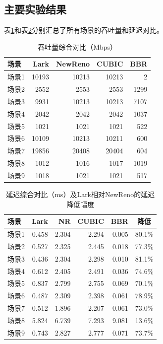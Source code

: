 \documentclass[10pt,twocolumn]{article}
\begin{document}
\subsection{主要实验结果}

表\ref{tab:throughput}和表\ref{tab:latency}分别汇总了所有场景的吞吐量和延迟对比。

\begin{table}[htbp]
\centering
\caption{吞吐量综合对比（Mbps）}
\label{tab:throughput}
\small
\begin{tabular}{lrrrr}
\toprule
\textbf{场景} & \textbf{Lark} & \textbf{NewReno} & \textbf{CUBIC} & \textbf{BBR} \\
\midrule
场景1 & 10193 & 10213 & 10213 & 2 \\
场景2 & 2552 & 2553 & 2553 & 1299 \\
场景3 & 9931 & 10213 & 10213 & 7107 \\
场景4 & 2042 & 2042 & 2042 & 1037 \\
场景5 & 1021 & 1021 & 1021 & 522 \\
场景6 & 10109 & 10213 & 10211 & 600 \\
场景7 & 19856 & 20408 & 20404 & 604 \\
场景8 & 1012 & 1016 & 1017 & 1019 \\
场景9 & 1018 & 1021 & 1021 & 517 \\
\bottomrule
\end{tabular}
\end{table}

\begin{table}[htbp]
\centering
\caption{延迟综合对比（ms）及Lark相对NewReno的延迟降低幅度}
\label{tab:latency}
\small
\begin{tabular}{lrrrrc}
\toprule
\textbf{场景} & \textbf{Lark} & \textbf{NR} & \textbf{CUBIC} & \textbf{BBR} & \textbf{降低} \\
\midrule
场景1 & 0.458 & 2.304 & 2.294 & 0.005 & 80.1\% \\
场景2 & 0.527 & 2.325 & 2.445 & 0.018 & 77.3\% \\
场景3 & 0.436 & 2.304 & 2.298 & 0.010 & 81.1\% \\
场景4 & 0.612 & 2.405 & 2.491 & 0.036 & 74.6\% \\
场景5 & 0.837 & 2.799 & 2.755 & 0.069 & 70.1\% \\
场景6 & 0.487 & 2.309 & 2.398 & 0.061 & 78.9\% \\
场景7 & 0.512 & 1.896 & 2.207 & 0.061 & 73.0\% \\
场景8 & 5.824 & 6.739 & 7.293 & 9.081 & 13.6\% \\
场景9 & 0.743 & 2.827 & 2.777 & 0.071 & 73.7\% \\
\bottomrule
\end{tabular}
\end{table}
\end{document}
